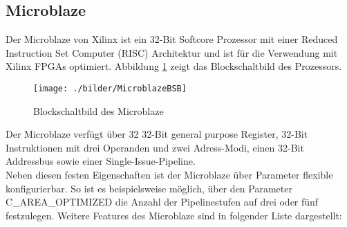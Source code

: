 \subsection{Microblaze}
Der Microblaze von Xilinx ist ein 32-Bit Softcore Prozessor mit einer Reduced Instruction Set Computer (RISC) Architektur und ist für die Verwendung mit Xilinx FPGAs optimiert. Abbildung \ref{fig:MicroblazeBSB} zeigt das Blockschaltbild des Prozessors.\\
\begin{figure}[h!]
\centering
\texttt{[image: ./bilder/MicroblazeBSB]}
\caption{Blockschaltbild des Microblaze \cite{MBREF}}
\label{fig:MicroblazeBSB}
\end{figure}
\noindent
Der Microblaze verfügt über 32 32-Bit general purpose Register, 32-Bit Instruktionen mit drei Operanden und zwei Adress-Modi, einen
32-Bit Addressbus sowie einer Single-Issue-Pipeline.\\
Neben diesen festen Eigenschaften ist der Microblaze über Parameter flexible konfigurierbar. So ist es beispielsweise möglich, über den Parameter C\_AREA\_OPTIMIZED die Anzahl der Pipelinestufen auf drei oder fünf festzulegen. Weitere Features des Microblaze sind in folgender Liste dargestellt:\\
